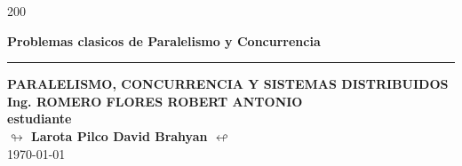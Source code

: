\begin{titlepage}
\begin{textblock}{200}
\begin{center}
            \vspace*{\fill}
                \begin{minipage}{0.9\textwidth}
                    \centering
                    {\Large {\textbf{Problemas clasicos de Paralelismo y Concurrencia}}}\par
                \end{minipage}
            \vspace*{\fill}
            \textcolor{azul}{\rule{0.5\linewidth}{0.80mm}} \par
            \vspace{8mm}
            {\large{\textbf{ PARALELISMO, CONCURRENCIA Y SISTEMAS DISTRIBUIDOS }}} \\[10pt]
            {\large{\textbf{\textcolor{azul}{Ing. ROMERO FLORES ROBERT ANTONIO }}}} \\[20pt]
            {\large{\textbf{estudiante}}}\\[10pt]
            {\large{\textbf{$\looparrowright$   Larota Pilco David Brahyan  $\looparrowleft$ }}}\\[5pt]
            \today

        \end{center}
    \end{textblock}
\end{titlepage}
%
%
%
%
%
